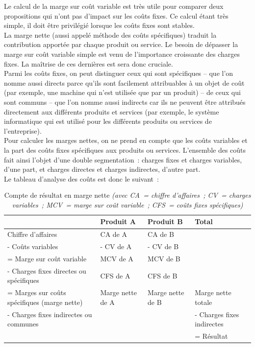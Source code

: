 \documentclass{tufte-handout}
\begin{document}
\begin{enumerate}
Le calcul de la marge sur coût variable est très utile pour comparer deux propositions qui n'ont pas d'impact sur les coûts fixes. Ce calcul étant très simple, il doit être privilégié lorsque les coûts fixes sont stables.\\

La marge nette (aussi appelé méthode des coûts spécifiques) traduit la contribution apportée par chaque produit ou service. Le besoin de dépasser la marge sur coût variable simple est venu de l'importance croissante des charges fixes. La maîtrise de ces dernières est sera donc cruciale.\\

Parmi les coûts fixes, on peut distinguer ceux qui sont spécifiques – que l'on nomme aussi directs parce qu'ils sont facilement attribuables à un objet de coût (par exemple, une machine qui n'est utilisée que par un produit) – de ceux qui sont communs – que l'on nomme aussi indirects car ils ne peuvent être attribués directement aux différents produits et services (par exemple, le système informatique qui est utilisé pour les différents produits ou services de l'entreprise).\\

Pour calculer les marges nettes, on ne prend en compte que les coûts variables et la part des coûts fixes spécifiques aux produits ou services. L'ensemble des coûts fait ainsi l'objet d'une double segmentation : charges fixes et charges variables, d'une part, et charges directes et charges indirectes, d'autre part.\\

Le tableau d'analyse des coûts est donc le suivant :\\

\begin{table}[htbp]
\caption{Compte de résultat en marge nette \emph{(avec CA = chiffre d'affaires ; CV = charges variables ; MCV = marge sur coût variable ; CFS = coûts fixes spécifiques)}}
\centering
\begin{tabular}{llll}
 & Produit A & Produit B & Total\\
\hline
Chiffre d'affaires & CA de A & CA de B & \\
- Coûts variables & - CV de A & - CV de B & \\
= Marge sur coût variable & MCV de A & MCV de B & \\
- Charges fixes directes ou spécifiques & CFS de A & CFS de B & \\
= Marges sur coûts spécifiques (marge nette) & Marge nette de A & Marge nette de B & Marge nette totale\\
- Charges fixes indirectes ou communes &  &  & - Charges fixes indirectes\\
 &  &  & = Résultat\\
\end{tabular}
\end{table}


\end{enumerate}
\end{document}

